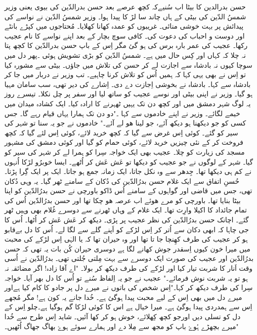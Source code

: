 حسن بدرالدین کا بیٹا
 اب سُنیےکہ کچھ عرصے بعد حسن بدرالدّین کی بیوی یعنی وزیر  شمسُ الدّین کی بیٹی کے ہاں چاند سا لڑ کا پیدا ہوا۔ وزیر شمسُ الدّین نے نواسے کی پیدائش پر بہت خوشی منائی۔ غریبوں کو عمدہ کھانا کھلایا۔ مُحتاجوں میں کپڑے بانٹے اور دوست و احباب کی دعوت کی۔ کافی سوچ بچار کے بعد اپنے نواسے کا نام عجیب رکھا۔
عجیب کی عمر بارہ برس کی ہو گئ مگر اِس کے باپ  حسن بدرالدّین کا کچھ پتا نہ چلا کہ کہاں اور کِس حال میں ہے۔ شمسُ الدّین  کو بڑی تشویش ہوئی ۔پھر دل میں سوچا کیوں نہ بادشاہ سے اجازت لے کر حسن کی تلاش میں جاؤں۔ بیٹی سے مشورہ کیا تو  اِس نے بھی یہی  کہا کہ ہمیں اُس کو تلاش کرنا چاہیے۔ تب وزیر نے دربار میں جا کر بادشاہ سے کہا۔ بادشاہ نے بخوشی اِجازت دے دی۔ اِشارے کی دیر  تھی، سب سامان مہیا  ہو گیا۔ وزیر نے اپنی بیٹی اور نوسے عجیب کو ساتھ لیا اور سفر پر چل نکلا۔
تیسرے روز  یہ لوگ شہر دمشق میں اور کچھ دن تک یہیں ٹھہرنے کا ارادہ کیا۔ ایک کشادہ میدان میں خیمے لگائے۔ وزیر نے اپنے خادموں سے کہا ۔"دو دن تک ہمارا یہاں قیام رہے گا۔ جس کسی کو جو دیکھنا ہو دیکھ آئے، جو لینا ھو لے آئے۔" 
خادموں نے جو یہ سنا تو شہر  کی سیر کو گئے۔ کوئی اِس غرض سے گیا کہ کچھ خرید لائے، کوئی اِس لئے گیا کہ کچھ فروخت کر کے نئی چیزیں خرید لائے، کوئی حمام کو گیا اور کوئی دمشق کی مشہور مسجد کی زیارت کو چلا۔ عجیب بھی ایک خواجہ سِرا کو ہمرا لے کر شہر کی سیر کو گیا۔
شہر کے لوگوں نے جو عجیب کو دیکھا تو عَش عَش کر اُٹھے۔ ایسا خوبرُو لڑکا اُنہوں نے کم ہی دیکھا تھا۔ جِدھر  سے وہ نکل جاتا، ایک زمانہ جمع ہو جاتا۔ ایک پر ایک گِرا پڑتا۔ 
حُسنِ اتفاق سے ایک غلام حسن بدرُالدّین کی دُکان کے سامنے ٹھر گیا۔ یہ وہی دُکان تھی، جس میں قاضی اور گواہوں کے سامنے اُس ڈاکو باورچی نے حسن بدرُالدّین کو اپنا بیٹا بنایا تھا۔ باورچی کو مرے ھوئے اب عرصہ ھو چکا تھا اور حسن بدرُالدّین اُس کی تمام جائداد کا اکیلا وارِث تھا۔ ایک غلام کے وہاں ٹھرنے سے دوسرے غُلام بھی وہیں ٹھر گئے۔ اچانک حسن بدرُالدّین کی نظر  عجیب پر پڑی۔ دیکھ کر عَش عَش کر اُٹھا۔ اُس کا جی چاہا کہ ابھی دکان سے اُتر کر اِس لڑکے کو اَپنے گلے سے لگا لے۔ اُس کا دل بےقابو ہو کر عجیب کی طرف کھِنچا جا تا تھا اور وہ حیران تھا کہ یا الہٰی اِس لڑکے کی محبت میں میرا خون کیوں اِسقدر جوش کھانے لگا ہے دوسری حیران کُن بات یہ تھی کہ حسن بدرُالدّین اور عجیب کی صورت ایک دوسرے سے بہت مِلتی جُلتی تھی۔ 
 بدرُالدّین نے اُسی وقت اَنار کا شربت تیار کیا اور  لڑکے کی طرف دیکھ کر بولا۔ "اے آقا زادہ! اگر مضائقہ نہ ہو  تو یہ شربت نوش فرمائے۔"
           عجیب نے جو یہ اِلفاظ سُنے تو اُس کا دل بھر آیا۔ خواجہ سِرا کی طرف دیکھ کر کہا۔"اِس شخص کی باتوں نے میرے دل پر جادو کا کام کیا ہےاور میرے دل میں بھی اِس  کے لیے محبت پیدا ہوگئ ہے۔ خُدا جانے یہ کون ہے! مگر مُجھے اِس سے ہمدردی پیدا ہوگئ ہے۔ میرا خیال ہے اس کا کوئی لڑکا گم ہوگیا ہے۔چلو اِس کے دل کو تسلی دیں اورجو کچھ کِھلائے، خوش ہو کر کھا آئیں۔ شاید اِس طرح سے خُدا میرے بچھڑے ہُوۓ باپ کو مجھ سے مِلا دے اور  ہمارے سوئے ہوۓ بھاگ جھاگ اُٹھیں۔"
